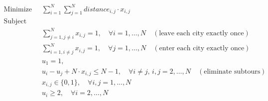 \documentclass{article}
\begin{document}
\begin{align*}
\text{Minimize } & \sum_{i=1}^{N} \sum_{j=1}^{N} distance_{i,j} \cdot x_{i,j} \\
\text{Subject to: } 
& \\
& \sum_{j=1, j \neq i}^{N} x_{i,j} = 1, \quad \forall i=1,\ldots,N \quad (\text{leave each city exactly once}) \\
& \sum_{i=1, i \neq j}^{N} x_{i,j} = 1, \quad \forall j=1,\ldots,N \quad (\text{enter each city exactly once}) \\
& u_1 = 1, \\
& u_i - u_j + N \cdot x_{i,j} \leq N-1, \quad \forall i \neq j, \, i,j=2,\ldots,N \quad (\text{eliminate subtours}) \\
& x_{i,j} \in \{0, 1\}, \quad \forall i,j = 1,\ldots,N \\
& u_i \geq 2, \quad \forall i=2,\ldots,N 
\end{align*}
\end{document}
